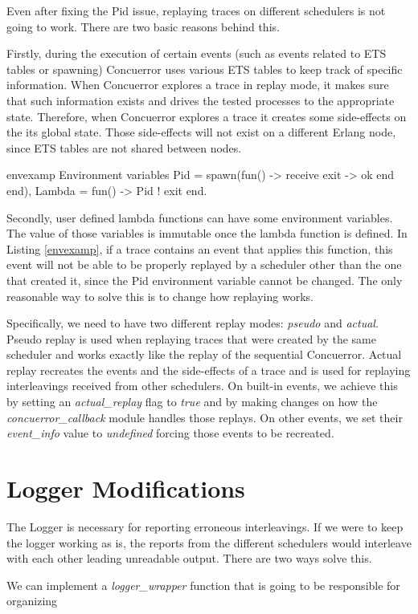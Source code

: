 Even after fixing the Pid issue, replaying traces on different schedulers is not going to work. There are two basic reasons behind this. 

Firstly, during the execution of certain events (such as events related to ETS tables or spawning) Concuerror uses various ETS 
tables to keep track of specific information. When Concuerror explores a trace in replay mode, it makes sure that such
 information exists and drives the tested processes to the appropriate state. Therefore, when Concuerror explores a
 trace it creates some side-effects on the its global state. Those side-effects will not exist on
 a different Erlang node, since ETS tables are not shared between nodes. 

\begin{code}{envexamp}{ Environment variables}
    Pid = spawn(fun() -> 
                    receive
                        exit ->
                            ok 
                    end
                end),
    Lambda =
        fun() ->
             Pid ! exit
        end.
\end{code}

Secondly, user defined lambda functions can have some environment variables. The value of those variables is
immutable once the lambda function is defined. In Listing \ref{envexamp}, if a trace contains an event
that applies this function, this event will not be able to be properly replayed by a scheduler other than the one that
created it, since the Pid environment variable cannot be changed. The only reasonable way to solve this is to
change how replaying works.

Specifically, we need to have two different replay modes: \textit{pseudo} and \textit{actual}. Pseudo replay is used when
replaying traces that were created by the same scheduler and works exactly like the replay of the sequential
Concuerror. Actual replay recreates the events and the side-effects of a trace and is used for
replaying interleavings received from other schedulers. On built-in events, we achieve this by setting an
\textit{actual\_replay} flag to \textit{true} and by making changes on how the \textit{concuerror\_callback} module handles those replays.
On other events, we set their \textit{event\_info} value to \textit{undefined} forcing those events to be recreated.

\section{Logger Modifications}

The Logger is necessary for reporting erroneous interleavings. If we were to keep the logger working as is,
the reports from the different schedulers would interleave with each other leading unreadable output. There are two ways
solve this.

We can implement a \textit{logger\_wrapper} function that is going to be responsible for organizing 